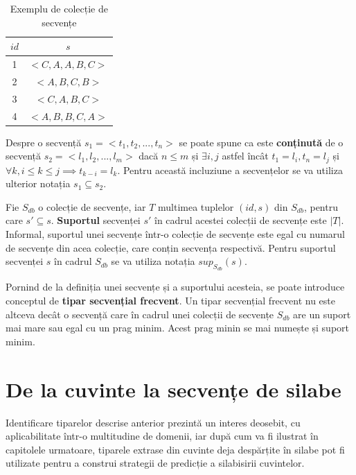 \begin{table}[h]
\centering    
\begin{tabular}{|c|c|}    
\hline      
$id$ & $s$ \\
\hline                    
1 & $<C,A,A,B,C>$ \\
2 & $<A,B,C,B>$ \\
3 & $<C,A,B,C>$ \\
4 & $<A,B,B,C,A>$ \\
\hline                              
\end{tabular}
\caption{Exemplu de colecție de secvențe}
\label{table:sdb}               
\end{table}

\begin{defi}
Despre o secvență $s_1=<t_1, t_2, ...,t_n>$ se poate spune ca este \textbf{conținută} de o secvență $s_2=<l_1, l_2, ...,l_m>$ dacă $n \leq m$ și $ \exists i,j$ astfel încât $t_1 = l_i, t_n = l_j$ și $\forall k, i \leq k \leq j \implies t_{k-i} = l_k$. Pentru această incluziune a secvențelor se va utiliza ulterior notația $s_1 \subseteq s_2$.
\end{defi}
      
\begin{defi}

Fie $S_{db}$ o colecție de secvențe, iar $T$ multimea tuplelor $(id, s)$ din $S_{db}$, pentru care $s' \subseteq s$. \textbf{Suportul} secvenței $s'$ în cadrul acestei colecții de secvențe este $\vert T \vert$.  Informal, suportul unei secvențe într-o colecție de secvențe este egal cu numarul de secvențe din acea colecție, care conțin secvența respectivă. Pentru suportul secvenței $s$ în cadrul $S_{db}$ se va utiliza notația $sup_{S_{db}}(s)$.
\end{defi}

\begin{defi}
Pornind de la definiția unei secvențe și a suportului acesteia, se poate introduce conceptul de \textbf{tipar secvențial frecvent}. Un tipar secvențial frecvent nu este altceva decât o secvență care în cadrul unei colecții de secvențe $S_{db}$ are un suport mai mare sau egal cu un prag minim. Acest prag minin se mai numește și suport minim.
\end{defi}
\section{De la cuvinte la secvențe de silabe}
Identificare tiparelor descrise anterior prezintă un interes deosebit, cu aplicabilitate într-o multitudine de domenii, iar după cum va fi ilustrat în capitolele urmatoare, tiparele extrase din cuvinte deja despărțite în silabe pot fi utilizate pentru a construi strategii de predicție a silabisirii cuvintelor. 

